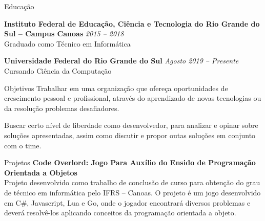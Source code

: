 \documentclass{resume} %
\begin{document}

\begin{rSection}{Educação}

{\bf Instituto Federal de Educação, Ciência e Tecnologia do Rio Grande do Sul -- Campus Canoas} \hfill {\em 2015 -- 2018} 
\\ Graduado como Técnico em Informática

{\bf Universidade Federal do Rio Grande do Sul} \hfill {\em Agosto 2019 -- Presente} 
\\ Cursando Ciência da Computação

\end{rSection}

\begin{rSection}{Objetivos}
Trabalhar em uma organização que ofereça oportunidades de crescimento pessoal e profissional, através do aprendizado de
novas tecnologias ou da resolução problemas desafiadores.

Buscar certo nível de liberdade como desenvolvedor, para analizar e opinar sobre soluções apresentadas, assim como
discutir e propor outas soluções em conjunto com o time.
\end{rSection}

\begin{rSection}{Projetos}
{\bf Code Overlord: Jogo Para Auxílio do Ensido de Programação Orientada a Objetos}\\
Projeto desenvolvido como trabalho de conclusão de curso para obtenção do grau de técnico em informática pelo IFRS --
Canoas. O projeto é um jogo desenvolvido em C\#, Javascript, Lua e Go, onde o jogador encontrará diversos problemas e deverá resolvê-los aplicando conceitos da programação orientada a objeto.
\end{rSection}


\end{document}
